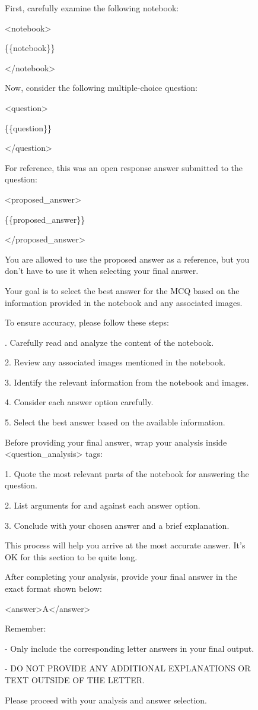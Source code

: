 \documentclass{article}
\begin{document}
\begin{figure}[htbp]
{\begin{minipage}{0.95\linewidth}
{\ttfamily\scriptsize First, carefully examine the following notebook:\par\smallskip
<notebook>\par \{\{notebook\}\}\par </notebook>\par\smallskip
Now, consider the following multiple-choice question:\par\smallskip
<question>\par \{\{question\}\}\par </question>\par\smallskip
For reference, this was an open response answer submitted to the question:\par\smallskip
<proposed\_answer>\par \{\{proposed\_answer\}\}\par </proposed\_answer>\par\smallskip
You are allowed to use the proposed answer as a reference, but you don't have to use it when selecting your final
answer.\par\smallskip
Your goal is to select the best answer for the MCQ based on the information provided in the notebook and any
associated images.\par
To ensure accuracy, please follow these steps:\par{}. Carefully read and analyze the content of the notebook.\par
2. Review any associated images mentioned in the notebook.\par
3. Identify the relevant information from the notebook and images.\par
4. Consider each answer option carefully.\par
5. Select the best answer based on the available information.\par\smallskip
Before providing your final answer, wrap your analysis inside <question\_analysis> tags:\par
1. Quote the most relevant parts of the notebook for answering the question.\par
2. List arguments for and against each answer option.\par
3. Conclude with your chosen answer and a brief explanation.\par\smallskip
This process will help you arrive at the most accurate answer. It's OK for this section to be quite long.\par\smallskip
After completing your analysis, provide your final answer in the exact format shown below:\par\smallskip
<answer>A</answer>\par\smallskip
Remember:\par
- Only include the corresponding letter answers in your final output.\par
- DO NOT PROVIDE ANY ADDITIONAL EXPLANATIONS OR TEXT OUTSIDE OF THE LETTER.\par\smallskip
Please proceed with your analysis and answer selection.\par}


\end{minipage}}
\end{figure}
\end{document}
